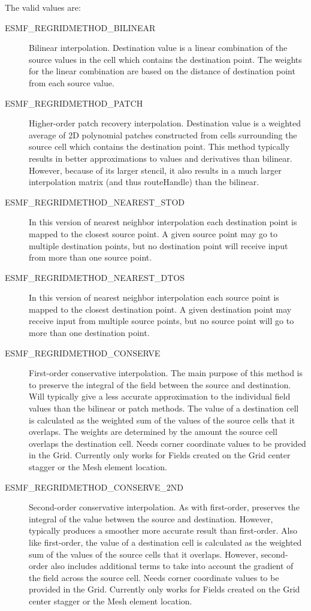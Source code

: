 The valid values are:
\begin{description}
\item [ESMF\_REGRIDMETHOD\_BILINEAR]
      Bilinear interpolation. Destination value is a linear combination of the source values in the cell which contains the destination point. The weights for the linear combination are based on the distance of destination point from each source value. 
\item [ESMF\_REGRIDMETHOD\_PATCH]
      Higher-order patch recovery interpolation. Destination value is a weighted average of 2D polynomial patches constructed from cells surrounding the source cell which contains the destination point. This method typically results in better approximations to values and derivatives than bilinear. However, because of its larger stencil, it also results in a much larger interpolation matrix (and thus routeHandle) than the bilinear. 
\item [ESMF\_REGRIDMETHOD\_NEAREST\_STOD]
      In this version of nearest neighbor interpolation each destination point is mapped to the closest source point. A given source point may go to multiple destination points, but no destination point will receive input from more than one source point. 
\item [ESMF\_REGRIDMETHOD\_NEAREST\_DTOS]
      In this version of nearest neighbor interpolation each source point is mapped to the closest destination point. A given destination point may receive input from multiple source points, but no source point will go to more than one destination point. 
\item [ESMF\_REGRIDMETHOD\_CONSERVE]
      First-order conservative interpolation. The main purpose of this method is to preserve the integral of the field between the source and destination. 
      Will typically give a less accurate approximation to the individual field values than the bilinear or patch methods. The value of a destination cell is calculated as the weighted sum of the values of the source cells that it overlaps. The weights are determined by the amount the source cell overlaps the destination cell. Needs corner coordinate values to be provided in the Grid. Currently only works for Fields created on the Grid center stagger or the Mesh element location. 
\item [ESMF\_REGRIDMETHOD\_CONSERVE\_2ND]
      Second-order conservative interpolation. As with first-order, preserves the integral of the value between the source and destination. However, typically produces a smoother more accurate result than first-order. Also like first-order, the value of a destination cell is calculated as the weighted sum of the values of the source cells that it overlaps. However, second-order also includes additional terms to take into account the gradient of the field across the source cell. Needs corner coordinate values to be provided in the Grid. Currently only works for Fields created on the Grid center stagger or the Mesh element location. 

\end{description}
